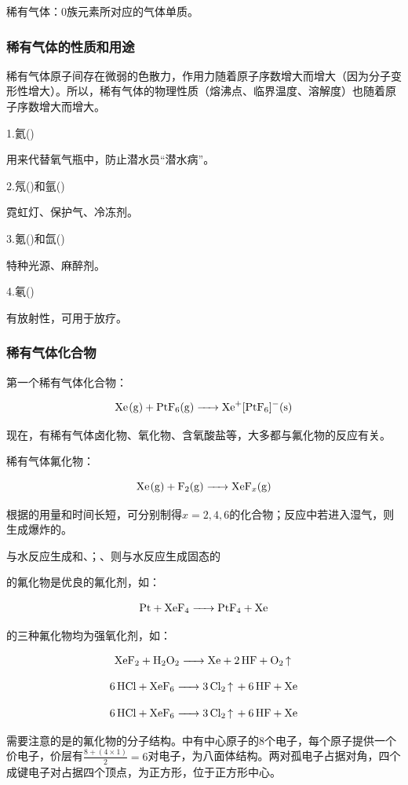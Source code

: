 \documentclass[a4paper,UTF8]{article}
\begin{document}
稀有气体：0族元素所对应的气体单质。

\subsubsection{稀有气体的性质和用途}

稀有气体原子间存在微弱的色散力，作用力随着原子序数增大而增大（因为分子变形性增大）。所以，稀有气体的物理性质（熔沸点、临界温度、溶解度）也随着原子序数增大而增大。

1.氦()

用来代替氧气瓶中，防止潜水员“潜水病”。

2.氖()和氩()

霓虹灯、保护气、冷冻剂。

3.氪()和氙()

特种光源、麻醉剂。

4.氡()

有放射性，可用于放疗。

\subsubsection{稀有气体化合物}
第一个稀有气体化合物：

$$ \ce{Xe(g) + PtF6(g) -> Xe+[PtF6]-(s)} $$

现在，有稀有气体卤化物、氧化物、含氧酸盐等，大多都与氟化物的反应有关。

稀有气体氟化物：

$$ \ce{Xe(g) + F2(g) -> XeF_{x}(g)} $$

根据的用量和时间长短，可分别制得$x=2,4,6$的化合物；反应中若进入湿气，则生成爆炸的。

与水反应生成和、；、则与水反应生成固态的

的氟化物是优良的氟化剂，如：

$$ \ce{Pt + XeF4 -> PtF4 + Xe} $$

的三种氟化物均为强氧化剂，如：

$$ \ce{XeF2 + H2O2 -> Xe + 2HF + O2\ce{^}} $$

$$ \ce{6HCl + XeF6 -> 3Cl2\ce{^} + 6HF + Xe} $$

$$ \ce{6HCl + XeF6 -> 3Cl2\ce{^} + 6HF + Xe} $$

需要注意的是的氟化物的分子结构。中有中心原子的8个电子，每个原子提供一个价电子，价层有$\frac{8+(4\times1)}{2}=6$对电子，为八面体结构。两对孤电子占据对角，四个成键电子对占据四个顶点，为正方形，位于正方形中心。
\end{document}
